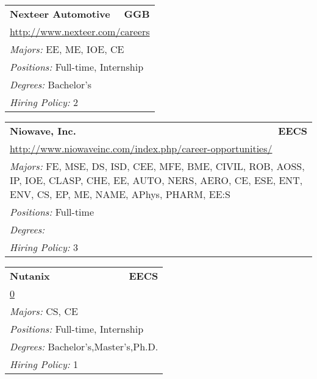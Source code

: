 \documentclass[twoside]{article}
\begin{document}
\begin{center}
\begin{multicols}{3}
\begin{FlushLeft}
\begin{minipage}{\columnwidth}
\end{minipage}
 
\begin{minipage}{\columnwidth}\begin{tabularx}{.95\columnwidth}{Xr}
                 {\Large\bf Nexteer Automotive} & {\Large\bf GGB}\\
    \multicolumn{2}{p{.95\columnwidth}}{\url{http://www.nexteer.com/careers}}\\
    \multicolumn{2}{p{.95\columnwidth}}{\emph{Majors:} EE, ME, IOE, CE}\\
    \multicolumn{2}{p{.95\columnwidth}}{\emph{Positions:} Full-time, Internship}\\
    \multicolumn{2}{p{.95\columnwidth}}{\emph{Degrees:} Bachelor's}\\
    \multicolumn{2}{p{.95\columnwidth}}{\emph{Hiring Policy:} 2}\\
    \end{tabularx}
    
\end{minipage}
 
\begin{minipage}{\columnwidth}\begin{tabularx}{.95\columnwidth}{Xr}
                 {\Large\bf Niowave, Inc.} & {\Large\bf EECS}\\
    \multicolumn{2}{p{.95\columnwidth}}{\url{http://www.niowaveinc.com/index.php/career-opportunities/}}\\
    \multicolumn{2}{p{.95\columnwidth}}{\emph{Majors:} FE, MSE, DS, ISD, CEE, MFE, BME, CIVIL, ROB, AOSS, IP, IOE, CLASP, CHE, EE, AUTO, NERS, AERO, CE, ESE, ENT, ENV, CS, EP, ME, NAME, APhys, PHARM, EE:S}\\
    \multicolumn{2}{p{.95\columnwidth}}{\emph{Positions:} Full-time}\\
    \multicolumn{2}{p{.95\columnwidth}}{\emph{Degrees:} }\\
    \multicolumn{2}{p{.95\columnwidth}}{\emph{Hiring Policy:} 3}\\
    \end{tabularx}
    
\end{minipage}
 
\begin{minipage}{\columnwidth}\begin{tabularx}{.95\columnwidth}{Xr}
                 {\Large\bf Nutanix} & {\Large\bf EECS}\\
    \multicolumn{2}{p{.95\columnwidth}}{\url{0}}\\
    \multicolumn{2}{p{.95\columnwidth}}{\emph{Majors:} CS, CE}\\
    \multicolumn{2}{p{.95\columnwidth}}{\emph{Positions:} Full-time, Internship}\\
    \multicolumn{2}{p{.95\columnwidth}}{\emph{Degrees:} Bachelor's,Master's,Ph.D.}\\
    \multicolumn{2}{p{.95\columnwidth}}{\emph{Hiring Policy:} 1}\\
    \end{tabularx}
    

\end{minipage}
\end{FlushLeft}
\end{multicols}
\end{center}
\end{document}
